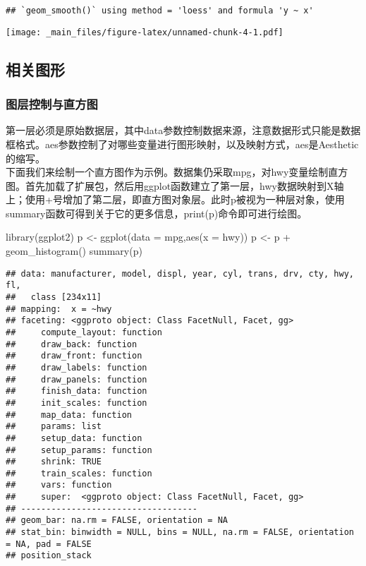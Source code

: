 \documentclass[
]{book}
\newenvironment{Shaded}{\begin{snugshade}}{\end{snugshade}}
\newcommand{\AttributeTok}[1]{\textcolor[rgb]{0.77,0.63,0.00}{#1}}
\newcommand{\FunctionTok}[1]{\textcolor[rgb]{0.00,0.00,0.00}{#1}}
\newcommand{\NormalTok}[1]{#1}
\newcommand{\OtherTok}[1]{\textcolor[rgb]{0.56,0.35,0.01}{#1}}
\newcommand{\SpecialCharTok}[1]{\textcolor[rgb]{0.00,0.00,0.00}{#1}}
\begin{document}
\begin{verbatim}
## `geom_smooth()` using method = 'loess' and formula 'y ~ x'
\end{verbatim}

\texttt{[image: \_main\_files/figure-latex/unnamed-chunk-4-1.pdf]}

\hypertarget{ux76f8ux5173ux56feux5f62}{%
\subsection{相关图形}\label{ux76f8ux5173ux56feux5f62}}

\hypertarget{ux56feux5c42ux63a7ux5236ux4e0eux76f4ux65b9ux56fe}{%
\subsubsection{图层控制与直方图}\label{ux56feux5c42ux63a7ux5236ux4e0eux76f4ux65b9ux56fe}}

第一层必须是原始数据层，其中data参数控制数据来源，注意数据形式只能是数据框格式。aes参数控制了对哪些变量进行图形映射，以及映射方式，aes是Aesthetic的缩写。\\
下面我们来绘制一个直方图作为示例。数据集仍采取mpg，对hwy变量绘制直方图。首先加载了扩展包，然后用ggplot函数建立了第一层，hwy数据映射到X轴上；使用+号增加了第二层，即直方图对象层。此时p被视为一种层对象，使用summary函数可得到关于它的更多信息，print(p)命令即可进行绘图。

\begin{Shaded}
\begin{Highlighting}[]
\FunctionTok{library}\NormalTok{(ggplot2)}
\NormalTok{p }\OtherTok{\textless{}{-}} \FunctionTok{ggplot}\NormalTok{(}\AttributeTok{data =}\NormalTok{ mpg,}\FunctionTok{aes}\NormalTok{(}\AttributeTok{x =}\NormalTok{ hwy))}
\NormalTok{p }\OtherTok{\textless{}{-}}\NormalTok{ p }\SpecialCharTok{+} \FunctionTok{geom\_histogram}\NormalTok{()}
\FunctionTok{summary}\NormalTok{(p)}
\end{Highlighting}
\end{Shaded}

\begin{verbatim}
## data: manufacturer, model, displ, year, cyl, trans, drv, cty, hwy, fl,
##   class [234x11]
## mapping:  x = ~hwy
## faceting: <ggproto object: Class FacetNull, Facet, gg>
##     compute_layout: function
##     draw_back: function
##     draw_front: function
##     draw_labels: function
##     draw_panels: function
##     finish_data: function
##     init_scales: function
##     map_data: function
##     params: list
##     setup_data: function
##     setup_params: function
##     shrink: TRUE
##     train_scales: function
##     vars: function
##     super:  <ggproto object: Class FacetNull, Facet, gg>
## -----------------------------------
## geom_bar: na.rm = FALSE, orientation = NA
## stat_bin: binwidth = NULL, bins = NULL, na.rm = FALSE, orientation = NA, pad = FALSE
## position_stack
\end{verbatim}
\end{document}
